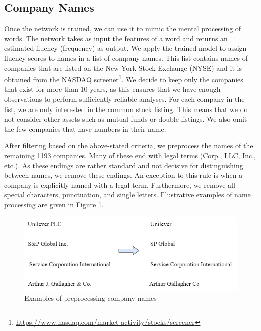 \documentclass[11pt]{article}
\begin{document}
\subsection{Company Names}
Once the network is trained, we can use it to mimic the mental processing of words. The network takes as input the features of a word and returns an estimated fluency (frequency) as output.
We apply the trained model to assign fluency scores to names in a list of company names. This list contains names of companies that are listed on the New York Stock Exchange (NYSE) and it is obtained from the NASDAQ screener\footnote{\url{https://www.nasdaq.com/market-activity/stocks/screener}}. We decide to keep only the companies that exist for more than 10 years, as this ensures that we have enough observations to perform sufficiently reliable analyses. For each company in the list, we are only interested in the common stock listing. This means that we do not consider other assets such as mutual funds or double listings. We also omit the few companies that have numbers in their name.

After filtering based on the above-stated criteria, we preprocess the names of the remaining 1193 companies. Many of these end with legal terms (Corp., LLC, Inc., etc.). As these endings are rather standard and not decisive for distinguishing between names, we remove these endings. An exception to this rule is when a company is explicitly named with a legal term. Furthermore, we remove all special characters, punctuation, and single letters. Illustrative examples of name processing are given in Figure \ref{fig:preprocessing}.

\begin{figure}[h]
    \centering
    \includegraphics[scale=0.6]{figures/processing.png}
    \caption{Examples of preprocessing company names}
    \label{fig:preprocessing}
\end{figure}
\noindent
\end{document}
